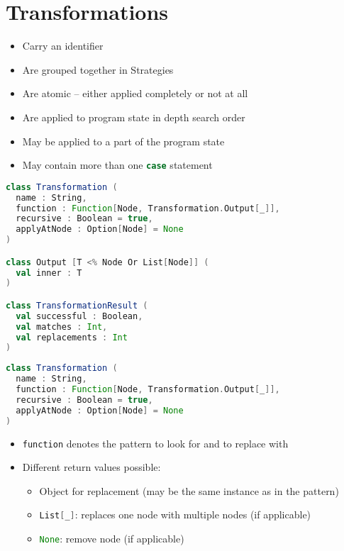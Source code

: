 \documentclass{article}
\begin{document}
\section{Transformations}
\begin{itemize}
 \item Carry an identifier
 \item Are grouped together in Strategies
 \item Are atomic -- either applied completely or not at all
 \item Are applied to program state in depth search order
 \item May be applied to a part of the program state
 \item May contain more than one \lstinline[language=scala]{case} statement
\end{itemize}


\begin{lstlisting}[language=scala]
class Transformation (
  name : String,
  function : Function[Node, Transformation.Output[_]],
  recursive : Boolean = true,
  applyAtNode : Option[Node] = None
)

class Output [T <% Node Or List[Node]] (
  val inner : T
)

class TransformationResult (
  val successful : Boolean,
  val matches : Int,
  val replacements : Int
)
\end{lstlisting}

\begin{lstlisting}[language=scala]
class Transformation (
  name : String,
  function : Function[Node, Transformation.Output[_]],
  recursive : Boolean = true,
  applyAtNode : Option[Node] = None
)
\end{lstlisting}

\begin{itemize}
 \item \lstinline[language=scala]{function} denotes the pattern to look for and to replace with
 \item Different return values possible:
 \begin{itemize}
  \item Object for replacement (may be the same instance as in the pattern)
  \item \lstinline[language=scala]{List[_]}: replaces one node with multiple nodes (if applicable)
  \item \lstinline[language=scala]{None}: remove node (if applicable)
 \end{itemize}
\end{itemize}
\end{document}

